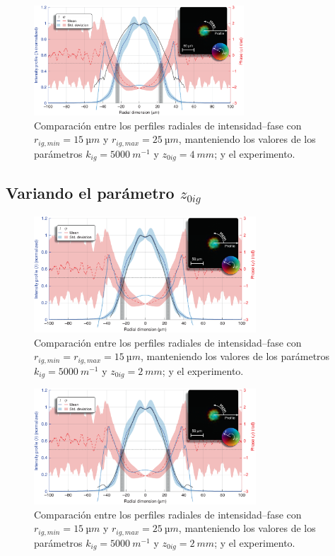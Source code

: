 \begin{figure}[htbp]
  \centering
  \includegraphics[width=0.7\textwidth]{Figuras/anx_cmp_56.png}
  \caption*{Comparación entre los perfiles radiales de intensidad--fase con $r_{ig,min}=\qty{15}{µm}$ y $r_{ig,max}=\qty{25}{µm}$, manteniendo los valores de los parámetros $k_{ig}=\qty{5000}{m^{-1}}$ y $z_{0ig}=\qty{4}{mm}$; y el experimento.}
\end{figure}

\newpage

\subsection*{Variando el parámetro $z_{0ig}$}

\begin{figure}[htbp!]
  \centering
  \includegraphics[width=0.74\textwidth]{Figuras/anx_cmp_61.png}
  \caption*{Comparación entre los perfiles radiales de intensidad--fase con $r_{ig,min}=r_{ig,max}=\qty{15}{µm}$, manteniendo los valores de los parámetros $k_{ig}=\qty{5000}{m^{-1}}$ y $z_{0ig}=\qty{2}{mm}$; y el experimento.}
\end{figure}

\begin{figure}[htbp!]
  \centering
  \includegraphics[width=0.74\textwidth]{Figuras/anx_cmp_62.png}
  \caption*{Comparación entre los perfiles radiales de intensidad--fase con $r_{ig,min}=\qty{15}{µm}$ y $r_{ig,max}=\qty{25}{µm}$, manteniendo los valores de los parámetros $k_{ig}=\qty{5000}{m^{-1}}$ y $z_{0ig}=\qty{2}{mm}$; y el experimento.}
\end{figure}

